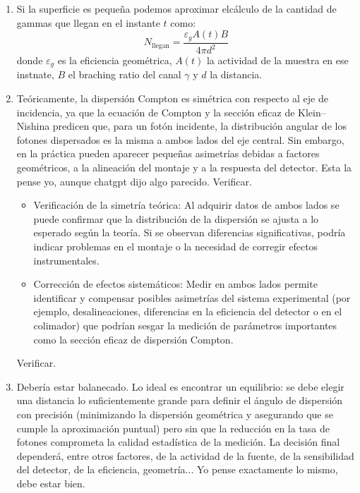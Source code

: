 \documentclass[11pt]{article}
\begin{document}
\begin{enumerate}[label=\alph*)]
    \item Si la superficie es pequeña podemos aproximar elcálculo de la cantidad de gammas que llegan en el instante $t$ como:
    \begin{equation}
        N_{\text{llegan}} = \frac{\varepsilon_g A(t)B}{4\pi d^2}
    \end{equation}
    donde $\varepsilon_g$ es la eficiencia geométrica, $A(t)$ la actividad de la muestra en ese instnate, $B$ el braching ratio del canal $\gamma$ y $d$ la distancia.
    \item Teóricamente, la dispersión Compton es simétrica con respecto al eje de incidencia, ya que la ecuación de Compton y la sección eficaz de Klein–Nishina predicen que, para un fotón incidente, la distribución angular de los fotones dispersados es la misma a ambos lados del eje central. Sin embargo, en la práctica pueden aparecer pequeñas asimetrías debidas a factores geométricos, a la alineación del montaje y a la respuesta del detector. \textcolor{BrickRed}{Esta la pense yo, aunque chatgpt dijo algo parecido. Verificar.}
    \begin{itemize}
        \item Verificación de la simetría teórica: Al adquirir datos de ambos lados se puede confirmar que la distribución de la dispersión se ajusta a lo esperado según la teoría. Si se observan diferencias significativas, podría indicar problemas en el montaje o la necesidad de corregir efectos instrumentales.

        \item Corrección de efectos sistemáticos: Medir en ambos lados permite identificar y compensar posibles asimetrías del sistema experimental (por ejemplo, desalineaciones, diferencias en la eficiencia del detector o en el colimador) que podrían sesgar la medición de parámetros importantes como la sección eficaz de dispersión Compton.
    \end{itemize}
    \textcolor{BrickRed}{Verificar.}
    \item Debería estar balanecado. Lo ideal es encontrar un equilibrio: se debe elegir una distancia lo suficientemente grande para definir el ángulo de dispersión con precisión (minimizando la dispersión geométrica y asegurando que se cumple la aproximación puntual) pero sin que la reducción en la tasa de fotones comprometa la calidad estadística de la medición. La decisión final dependerá, entre otros factores, de la actividad de la fuente, de la sensibilidad del detector, de la eficiencia, geometría... \textcolor{BrickRed}{Yo pense exactamente lo mismo, debe estar bien.}
\end{enumerate}
\end{document}
